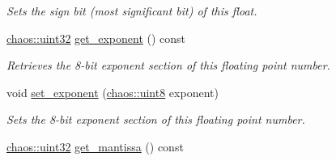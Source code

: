 \begin{DoxyCompactItemize}
\begin{DoxyCompactList}\small\item\em Sets the sign bit (most significant bit) of this float. \end{DoxyCompactList}\item 
\hypertarget{unionchaos_1_1data_1_1_bitwise_float_a18da7f215f0f901943f24556cd9f1f4e}{}\hyperlink{namespacechaos_a8641b3ae4551f0b35570d4f9f4ec22d9}{chaos\+::uint32} \hyperlink{unionchaos_1_1data_1_1_bitwise_float_a18da7f215f0f901943f24556cd9f1f4e}{get\+\_\+exponent} () const \label{unionchaos_1_1data_1_1_bitwise_float_a18da7f215f0f901943f24556cd9f1f4e}

\begin{DoxyCompactList}\small\item\em Retrieves the 8-\/bit exponent section of this floating point number. \end{DoxyCompactList}\item 
\hypertarget{unionchaos_1_1data_1_1_bitwise_float_af3558e3752a224efb2b5e1b7df0ff473}{}void \hyperlink{unionchaos_1_1data_1_1_bitwise_float_af3558e3752a224efb2b5e1b7df0ff473}{set\+\_\+exponent} (\hyperlink{namespacechaos_acbc0796d6929e3182cfd4f5c0176ab51}{chaos\+::uint8} exponent)\label{unionchaos_1_1data_1_1_bitwise_float_af3558e3752a224efb2b5e1b7df0ff473}

\begin{DoxyCompactList}\small\item\em Sets the 8-\/bit exponent section of this floating point number. \end{DoxyCompactList}\item 
\hypertarget{unionchaos_1_1data_1_1_bitwise_float_afe4e313f09b01b6492a0dffce0d47b0b}{}\hyperlink{namespacechaos_a8641b3ae4551f0b35570d4f9f4ec22d9}{chaos\+::uint32} \hyperlink{unionchaos_1_1data_1_1_bitwise_float_afe4e313f09b01b6492a0dffce0d47b0b}{get\+\_\+mantissa} () const \label{unionchaos_1_1data_1_1_bitwise_float_afe4e313f09b01b6492a0dffce0d47b0b}


\end{DoxyCompactItemize}
